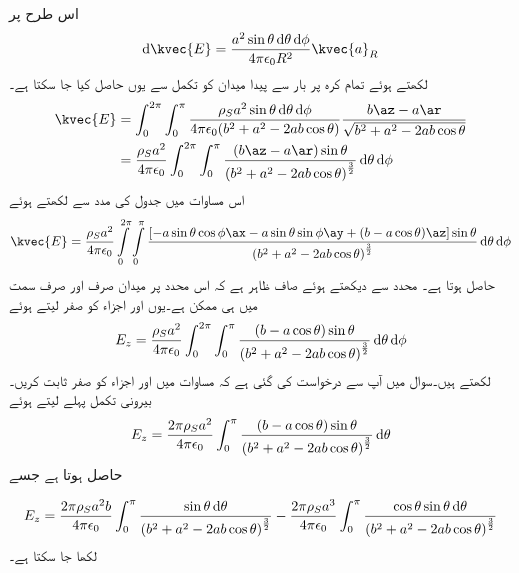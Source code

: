 اس طرح  پر
%
\begin{align*}
\dif \kvec{E}= \frac{a^2 \sin \theta \dif \theta \dif \phi}{4 \pi \epsilon_0 R^2} \kvec{a}_R
\end{align*} 
لکھتے ہوئے تمام کرہ پر بار سے پیدا میدان کو تکمل سے یوں حاصل کیا جا سکتا ہے۔
\begin{gather}
\begin{aligned}
\kvec{E}&=\int_{0}^{2\pi} \int_0^{\pi} \frac{\rho_S a^2 \sin \theta \dif \theta \dif \phi}{4 \pi \epsilon_0 (b^2+a^2-2 ab \cos \theta)} \frac{b\az-a\ar}{\sqrt{b^2+a^2-2 ab \cos \theta}}\\
&=\frac{\rho_S a^2}{4 \pi \epsilon_0}\int_{0}^{2\pi} \int_0^{\pi} \frac{ (b\az-a\ar)\sin \theta }{ \left(b^2+a^2-2 ab \cos \theta \right)^{\frac{3}{2}}} \dif \theta \dif \phi
\end{aligned}
\end{gather}
اس مساوات میں جدول  کی مدد سے  لکھتے ہوئے
\begin{align}\label{مساوات_کولمب_کرہ-سطحی_بار_کثافت_کا_میدان}
\kvec{E}=\frac{\rho_S a^2}{4 \pi \epsilon_0}\int \limits_{0}^{2\pi} \int \limits_0^{\pi} \frac{[-a \sin \theta \cos \phi \ax-a \sin \theta \sin \phi \ay+ (b-a \cos \theta)\az ]\sin \theta }{ \left(b^2+a^2-2 ab \cos \theta \right)^{\frac{3}{2}}} \dif \theta \dif \phi
\end{align}
حاصل ہوتا ہے۔ محدد سے دیکھتے ہوئے صاف ظاہر ہے کہ اس محدد پر میدان صرف اور صرف  سمت میں ہی ممکن ہے۔یوں  اور  اجزاء کو صفر لیتے ہوئے
\begin{align}
E_z=\frac{\rho_S a^2}{4 \pi \epsilon_0}\int_{0}^{2\pi} \int_0^{\pi} \frac{(b-a \cos \theta) \sin \theta }{ \left(b^2+a^2-2 ab \cos \theta \right)^{\frac{3}{2}}} \dif \theta \dif \phi
\end{align}
لکھتے ہیں۔سوال  میں آپ سے  درخواست کی گئی ہے کہ  مساوات  میں  اور  اجزاء کو صفر ثابت کریں۔بیرونی تکمل پہلے لیتے ہوئے
\begin{align}
E_z=\frac{2 \pi\rho_S a^2}{4 \pi \epsilon_0} \int_0^{\pi} \frac{(b-a \cos \theta) \sin \theta }{ \left(b^2+a^2-2 ab \cos \theta \right)^{\frac{3}{2}}} \dif \theta
\end{align}
حاصل ہوتا ہے جسے

\begin{align}\label{مساوات_کولمب_کرہ_بار_کا_میدان_الف}
E_z=\frac{2 \pi\rho_S a^2 b}{4 \pi \epsilon_0} \int_0^{\pi} \frac{ \sin \theta \dif \theta}{ \left(b^2+a^2-2 ab \cos \theta \right)^{\frac{3}{2}}}-\frac{2 \pi\rho_S a^3}{4 \pi \epsilon_0} \int_0^{\pi} \frac{\cos \theta \sin \theta \dif \theta}{ \left(b^2+a^2-2 ab \cos \theta \right)^{\frac{3}{2}}}
\end{align}
لکھا جا سکتا ہے۔

